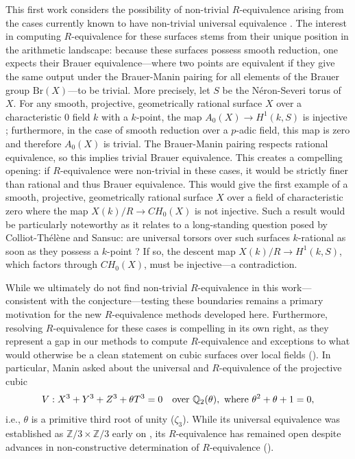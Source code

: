 \documentclass[11pt]{article}
\theoremstyle{definition}
\begin{document}
This first work considers the possibility of non-trivial $R$-equivalence arising from the cases currently known to have non-trivial universal equivalence \cite{dimitrikanevsky}. 
The interest in computing $R$-equivalence for these surfaces stems from their unique position in the arithmetic landscape: because these surfaces possess smooth reduction, one expects their Brauer equivalence---where two points are equivalent if they give the same output under the Brauer-Manin pairing for all elements of the Brauer group $\text{Br}(X)$---to be trivial. More precisely, let $S$ be the Néron-Severi torus of $X$. For any smooth, projective, geometrically rational surface $X$ over a characteristic 0 field $k$ with a $k$-point, the map $A_0(X) \to H^1(k, S)$ is injective \cite[Prop.4]{colliot1983}; furthermore, in the case of smooth reduction over a $p$-adic field, this map is zero \cite[Thm.0.2]{bloch1981chow} \cite[Thm.4]{dalawat2005groupe} and therefore $A_0(X)$ is trivial. The Brauer-Manin pairing respects rational equivalence, so this implies trivial Brauer equivalence.
This creates a compelling opening: if $R$-equivalence were non-trivial in these cases, it would be strictly finer than rational and thus Brauer equivalence. This would give the first example of a smooth, projective, geometrically rational surface $X$ over a field of characteristic zero where the map $X(k)/R \to CH_0(X)$ is not injective. Such a result would be particularly noteworthy as it relates to a long-standing question posed by Colliot-Thélène and Sansuc: are universal torsors over such surfaces $k$-rational as soon as they possess a $k$-point \cite[\S 2.8]{colliot1987descente}? If so, the descent map $X(k)/R \to H^1(k, S)$, which factors through $CH_0(X)$, must be injective---a contradiction.

While we ultimately do not find non-trivial $R$-equivalence in this work—consistent with the conjecture—testing these boundaries remains a primary motivation for the new $R$-equivalence methods developed here. Furthermore, resolving $R$-equivalence for these cases is compelling in its own right, as they represent a gap in our methods to compute $R$-equivalence and exceptions to what would otherwise be a clean statement on cubic surfaces over local fields (). In particular, Manin \cite[end of \S II.6]{manin3firstedition} asked about the universal and $R$-equivalence of the projective cubic
\begin{equation}
\label{eq:manin}
    V : X^3 + Y^3 + Z^3 + \theta T^3 = 0 \textrm{\quad over } \mathbb{Q}_2(\theta), \textrm{ where } \theta^2 + \theta + 1 = 0,
\end{equation}
i.e., $\theta$ is a primitive third root of unity ($\zeta_3$). While its universal equivalence was established as $\mathbb{Z}/3 \times \mathbb{Z}/3$ early on \cite[1.6]{dimitrikanevsky}, its $R$-equivalence  has remained open \cite[Thm.2.iii]{swinnertondyer} \cite[\S16]{manin3} \cite[\S6]{weak-approx} despite advances in non-constructive determination of $R$-equivalence ().
\end{document}

